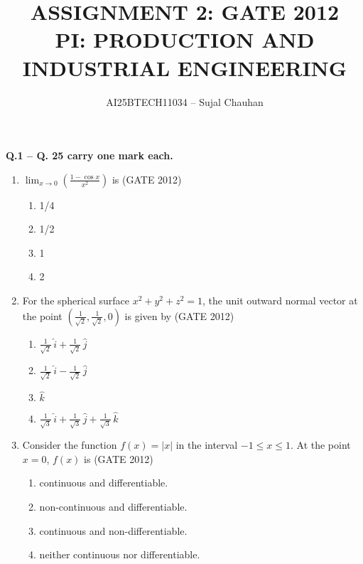 \documentclass[journal,12pt,onecolumn]{IEEEtran}
\theoremstyle{remark}
\begin{document}
\title{
ASSIGNMENT 2: GATE 2012 \\
PI: PRODUCTION AND INDUSTRIAL ENGINEERING}
\author{AI25BTECH11034 -- Sujal Chauhan}
\date{}
\maketitle
\textbf{Q.1 -- Q. 25 carry one mark each.}

\begin{enumerate}
\vspace{1cm}
  \item $\lim_{x \to 0} \left( \frac{1-\cos x}{x^2} \right)$ is \hfill{(GATE 2012)}
  \begin{enumerate}
    \item 1/4
    \item 1/2
    \item 1
    \item 2
  \end{enumerate}
\vspace{1cm}
  \item For the spherical surface $x^2 + y^2 + z^2 = 1$, the unit outward normal vector at the point $\left(\tfrac{1}{\sqrt{2}}, \tfrac{1}{\sqrt{2}}, 0\right)$ is given by
  \hfill{(GATE 2012)}
  \begin{enumerate}
    \item $\tfrac{1}{\sqrt{2}} \, \hat{i} + \tfrac{1}{\sqrt{2}} \, \hat{j}$
    \item $\tfrac{1}{\sqrt{2}} \, \hat{i} - \tfrac{1}{\sqrt{2}} \, \hat{j}$
    \item $\hat{k}$
    \item $\tfrac{1}{\sqrt{3}} \, \hat{i} + \tfrac{1}{\sqrt{3}} \, \hat{j} + \tfrac{1}{\sqrt{3}} \, \hat{k}$
  \end{enumerate}
\vspace{1cm}
  \item Consider the function $f(x) = |x|$ in the interval $-1 \leq x \leq 1$. At the point $x = 0$, $f(x)$ is
  \hfill{(GATE 2012)}
  \begin{enumerate}
    \item continuous and differentiable.
    \item non-continuous and differentiable.
    \item continuous and non-differentiable.
    \item neither continuous nor differentiable.
  \end{enumerate}
\vspace{1cm}

\end{enumerate}
\end{document}
